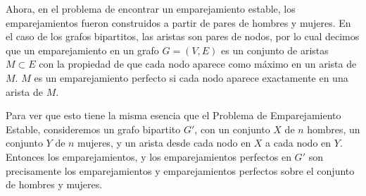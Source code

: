 \documentclass[a4paper, 12pt]{book}
\theoremstyle{dotless}
\begin{document}

Ahora, en el problema de encontrar un emparejamiento estable, los emparejamientos fueron construidos a partir de pares de hombres y mujeres. En el caso de los grafos bipartitos, las aristas son pares de nodos, por lo cual decimos que un emparejamiento en un grafo $G = (V,E)$ es un conjunto de aristas $M \subset E$ con la propiedad de que cada nodo aparece como máximo en un arista de $M$. $M$ es un emparejamiento perfecto si cada nodo aparece exactamente en una arista de $M$.

Para ver que esto tiene la misma esencia que el Problema de Emparejamiento Estable, consideremos un grafo bipartito $G'$, con un conjunto $X$ de $n$ hombres, un conjunto $Y$ de $n$ mujeres, y un arista desde cada nodo en $X$ a cada nodo en $Y$. Entonces los emparejamientos, y los emparejamientos perfectos en $G'$ son precisamente los emparejamientos y emparejamientos perfectos sobre el conjunto de hombres y mujeres.
\end{document}
